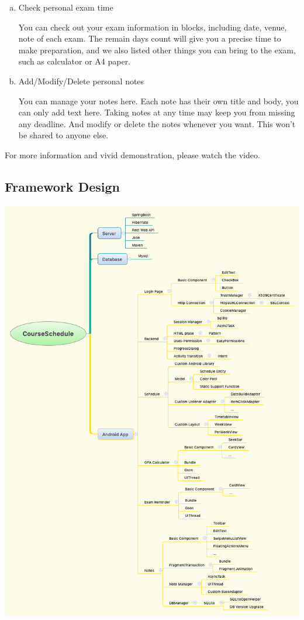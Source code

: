 \documentclass{article}
\begin{document}
\begin{enumerate}[a)]
    \item Check personal exam time
    
    You can check out your exam information in blocks, 
    including date, venue, note of each exam.
    The remain days count will give you a precise time 
    to make preparation, 
    and we also listed other things you can bring to the exam,
    such as calculator or A4 paper.

    \item Add/Modify/Delete personal notes
    
    You can manage your notes here. 
    Each note has their own title and body,
    you can only add text here.
    Taking notes at any time may keep you from missing any deadline.
    And modify or delete the notes whenever you want.
    This won't be shared to anyone else.
    \end{enumerate}

    For more information and vivid demonstration, 
    please watch the video.

    \subsection{Framework Design}
    \begin{center}
        \includegraphics[width=6.3in]{CourseScheduleFramework}
    \end{center}
    
\end{document}
